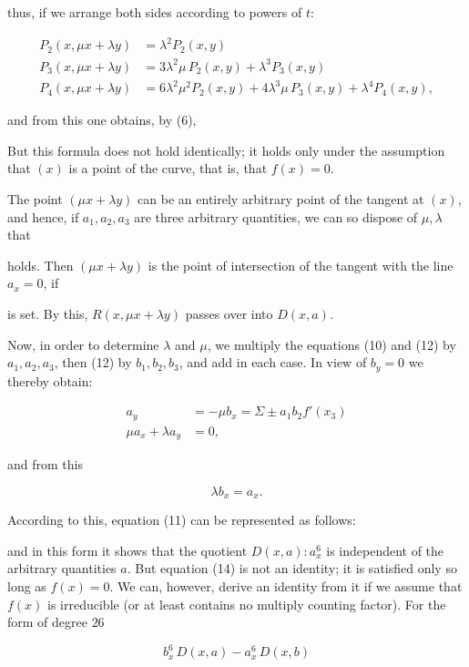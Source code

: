 thus, if we arrange both sides according to powers of $t$:

\[
\begin{aligned}
P_2(x,\mu x + \lambda y) &= \lambda^2 P_2(x,y)\\
P_3(x,\mu x + \lambda y) &= 3\lambda^2\mu\, P_2(x,y) + \lambda^3 P_3(x,y)\\
P_4(x,\mu x + \lambda y) &= 6\lambda^2\mu^2 P_2(x,y) + 4\lambda^3\mu\, P_3(x,y) + \lambda^4 P_4(x,y),
\end{aligned}
\]

and from this one obtains, by (6),


But this formula does not hold identically; it holds only under the assumption that $(x)$ is a point of the curve, that is, that $f(x) = 0$.

The point $(\mu x+\lambda y)$ can be an entirely arbitrary point of the tangent at $(x)$, and hence, if $a_1, a_2, a_3$ are three arbitrary quantities, we can so dispose of $\mu, \lambda$ that


holds. Then $(\mu x+\lambda y)$ is the point of intersection of the tangent with the line $a_x = 0$, if


is set. By this, $R(x,\mu x+\lambda y)$ passes over into $D(x,a)$.

Now, in order to determine $\lambda$ and $\mu$, we multiply the equations (10) and (12) by $a_1, a_2, a_3$, then (12) by $b_1, b_2, b_3$, and add in each case. In view of $b_y = 0$ we thereby obtain:

\[
\begin{aligned}
a_y &= -\mu b_x = \Sigma \pm a_1 b_2 f'(x_3)\\
\mu a_x + \lambda a_y &= 0,
\end{aligned}
\]

and from this

\[
\lambda b_x = a_x.
\]

According to this, equation (11) can be represented as follows:


and in this form it shows that the quotient $D(x,a) : a_x^6$ is independent of the arbitrary quantities $a$. But equation (14) is not an identity; it is satisfied only so long as $f(x) = 0$. We can, however, derive an identity from it if we assume that $f(x)$ is irreducible (or at least contains no multiply counting factor). For the form of degree $26$

\[
b_x^6\, D(x,a) - a_x^6\, D(x,b)
\]
